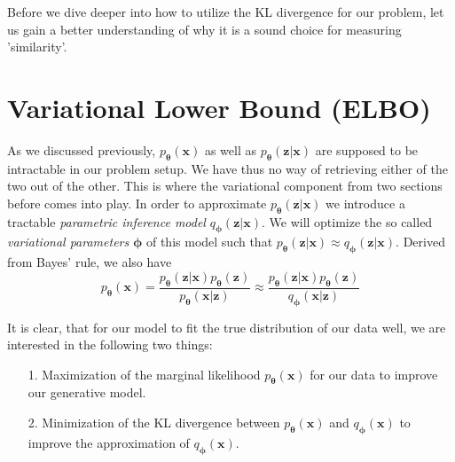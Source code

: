 \documentclass[12pt]{report}
\theoremstyle{definition}
\begin{document}
Before we dive deeper into how to utilize the KL divergence for our problem, let us gain a better understanding of why it is a sound choice for measuring 'similarity'. %

\section{Variational Lower Bound (ELBO)}
As we discussed previously, $p_{\mathbf{\theta}}(\mathbf{x})$ as well as $p_{\mathbf{\theta}}(\mathbf{z}|\mathbf{x})$ are supposed to be intractable in our problem setup. We have thus no way of retrieving either of the two out of the other. This is where the variational component from two sections before comes into play. In order to approximate $p_{\mathbf{\theta}}(\mathbf{z}|\mathbf{x})$ we introduce a tractable \emph{parametric inference model} $q_{\mathbf{\phi}}(\mathbf{z}|\mathbf{x})$. We will optimize the so called \emph{variational parameters} $\pmb{\phi}$ of this model such that $p_{\mathbf{\theta}}(\mathbf{z}|\mathbf{x}) \approx q_{\mathbf{\phi}}(\mathbf{z}|\mathbf{x})$.
Derived from Bayes' rule, we also have
\begin{equation}
	p_{\mathbf{\theta}}(\mathbf{x}) = \frac{p_{\mathbf{\theta}}(\mathbf{z}|\mathbf{x}) p_{\mathbf{\theta}}(\mathbf{z})}{p_{\mathbf{\theta}}(\mathbf{x}|\mathbf{z})} \approx  \frac{p_{\mathbf{\theta}}(\mathbf{z}|\mathbf{x}) p_{\mathbf{\theta}}(\mathbf{z})}{q_{\mathbf{\phi}}(\mathbf{x}|\mathbf{z})}
\end{equation}

It is clear, that for our model to fit the true distribution of our data well, we are interested in the following two things:
\begin{itemize}
	\item[1.] Maximization of the marginal likelihood $p_{\mathbf{\theta}}(\mathbf{x})$ for our data to improve our generative model.
	\item[2.] Minimization of the KL divergence between $p_{\mathbf{\theta}}(\mathbf{x})$ and $q_{\mathbf{\phi}}(\mathbf{x})$ to improve the approximation of $q_{\mathbf{\phi}}(\mathbf{x})$.
\end{itemize}
\end{document}
